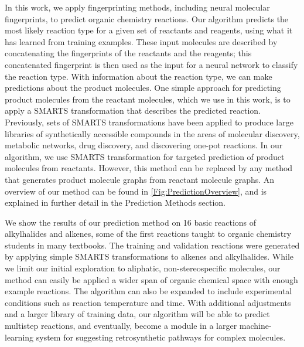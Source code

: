 In this work, we apply fingerprinting methods, including neural molecular fingerprints, to predict organic chemistry reactions. Our algorithm predicts the most likely reaction type for a given set of reactants and reagents, using what it has learned from training examples. These input molecules are described by concatenating the fingerprints of the reactants and the reagents; this concatenated fingerprint is then used as the input for a neural network to classify the reaction type. With information about the reaction type, we can make predictions about the product molecules. One simple approach for predicting product molecules from the reactant molecules, which we use in this work, is to apply a SMARTS transformation that describes the predicted reaction. Previously, sets of SMARTS transformations have been applied to produce large libraries of synthetically accessible compounds in the areas of molecular discovery\cite{Virshup_2013}, metabolic networks\cite{mann2013graph}, drug discovery\cite{Schuerer_2005}, and discovering one-pot reactions\cite{gothard2012rewiring}. In our algorithm, we use SMARTS transformation for targeted prediction of product molecules from reactants. However, this method can be replaced by any method that generates product molecule graphs from reactant molecule graphs.  An overview of our method can be found in \ref{Fig:PredictionOverview}, and is explained in further detail in the Prediction Methods section.

We show the results of our prediction method on 16 basic reactions of alkylhalides and alkenes, some of the first reactions taught to organic chemistry students in many textbooks\cite{wade2013organic}.  The training and validation reactions were generated by applying simple SMARTS transformations to alkenes and alkylhalides. While we limit our initial exploration to aliphatic, non-stereospecific molecules, our method can easily be applied a wider span of organic chemical space with enough example reactions. The algorithm can also be expanded to include experimental conditions such as reaction temperature and time. With additional adjustments and a larger library of training data, our algorithm will be able to predict multistep reactions, and eventually, become a module in a larger machine-learning system for suggesting retrosynthetic pathways for complex molecules.

